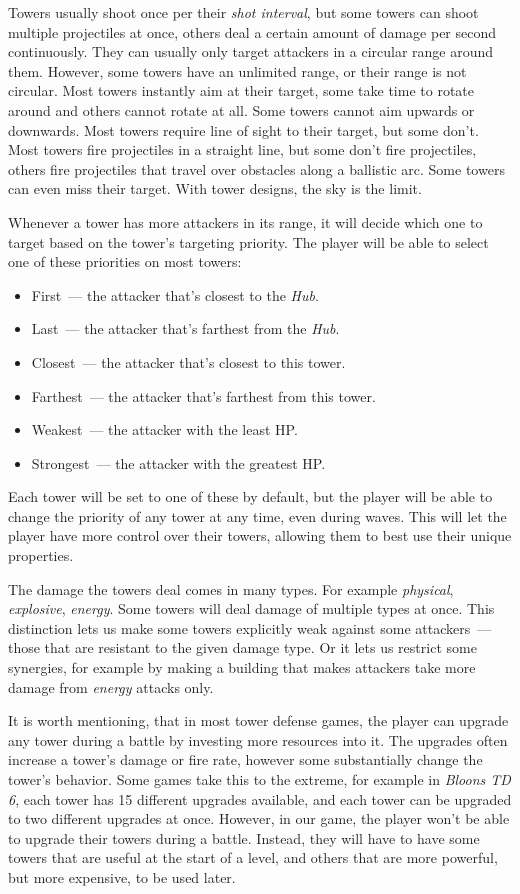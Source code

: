 Towers usually shoot once per their \emph{shot interval}, but some towers can shoot multiple projectiles at once, others deal a certain amount of damage per second continuously.
They can usually only target attackers in a circular range around them.
However, some towers have an unlimited range, or their range is not circular.
Most towers instantly aim at their target, some take time to rotate around and others cannot rotate at all.
Some towers cannot aim upwards or downwards.
Most towers require line of sight to their target, but some don't.
Most towers fire projectiles in a straight line, but some don't fire projectiles, others fire projectiles that travel over obstacles along a ballistic arc.
Some towers can even miss their target.
With tower designs, the sky is the limit.

Whenever a tower has more attackers in its range, it will decide which one to target based on the tower's targeting priority.
The player will be able to select one of these priorities on most towers:
\begin{itemize}
    \item First~--- the attacker that's closest to the \emph{Hub}.
    \item Last~--- the attacker that's farthest from the \emph{Hub}.
    \item Closest~--- the attacker that's closest to this tower.
    \item Farthest~--- the attacker that's farthest from this tower.
    \item Weakest~--- the attacker with the least HP.
    \item Strongest~--- the attacker with the greatest HP.
\end{itemize}
Each tower will be set to one of these by default, but the player will be able to change the priority of any tower at any time, even during waves.
This will let the player have more control over their towers, allowing them to best use their unique properties.

The damage the towers deal comes in many types.
For example \emph{physical}, \emph{explosive}, \emph{energy}.
Some towers will deal damage of multiple types at once.
This distinction lets us make some towers explicitly weak against some attackers~--- those that are resistant to the given damage type.
Or it lets us restrict some synergies, for example by making a building that makes attackers take more damage from \emph{energy} attacks only.

It is worth mentioning, that in most tower defense games, the player can upgrade any tower during a battle by investing more resources into it.
The upgrades often increase a tower's damage or fire rate, however some substantially change the tower's behavior.
Some games take this to the extreme, for example in \emph{Bloons TD 6}, each tower has 15 different upgrades available, and each tower can be upgraded to two different upgrades at once.
However, in our game, the player won't be able to upgrade their towers during a battle.
Instead, they will have to have some towers that are useful at the start of a level, and others that are more powerful, but more expensive, to be used later.

